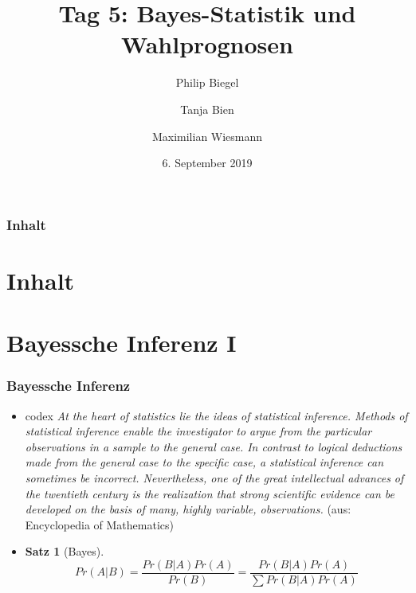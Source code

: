 \documentclass[aspectratio=169,xcolor=dvipsnames]{beamer}
\title[Bayes-Statistik \& Wahlprognosen]{\textbf{Tag 5: Bayes-Statistik und Wahlprognosen}}
\author[Philip \and Tanja \and Maximilian]{Philip Biegel \and Tanja Bien \and Maximilian Wiesmann}
\institute[]{Sommerakademie der Studienstiftung Olang - Arbeitsgruppe 4: Empirische Wahlforschung und Wahlprognosen}
\date{6. September 2019}
\newtheorem{satz}{Satz}
\begin{document}
\begin{frame}
\titlepage
\end{frame}

\begin{frame}
\frametitle{Inhalt}
\section[Inhalt]{Inhalt}
\end{frame}

\section{Bayessche Inferenz I}

\begin{frame}
\frametitle{Bayessche Inferenz}
\begin{itemize}
	\item[]<1-> 
	\begin{beamercolorbox}[sep=0.5em,wd=\textwidth,shadow=true,rounded=true]{codex}
		\textit{\glqq At the heart of statistics lie the ideas of statistical inference. Methods of statistical inference enable the investigator to argue from the particular observations in a sample to the general case. In contrast to logical deductions made from the general case to the specific case, a statistical inference can sometimes be incorrect. Nevertheless, one of the great intellectual advances of the twentieth century is the realization that strong scientific evidence can be developed on the basis of many, highly variable, observations.\grqq} (aus: Encyclopedia of Mathematics)
	\end{beamercolorbox}
	\item[]<2->
	\begin{satz}[Bayes]
		$$Pr(A|B) = \frac{Pr(B|A)Pr(A)}{Pr(B)} = \frac{Pr(B|A)Pr(A)}{\sum Pr(B|A)Pr(A)}$$
	\end{satz}
\end{itemize}
\end{frame}
\end{document}
